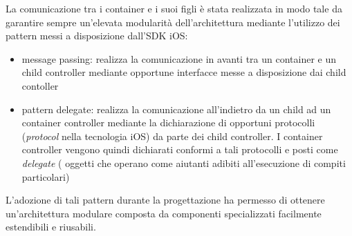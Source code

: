 La comunicazione tra i container e i suoi figli è stata realizzata in modo tale da garantire sempre un'elevata modularità dell'architettura mediante l'utilizzo dei pattern messi a disposizione dall'SDK iOS:

\begin{itemize}
 \item message passing: realizza la comunicazione in avanti tra un container e un child controller mediante opportune interfacce messe a disposizione dai child contoller
 \item pattern delegate: realizza la comunicazione all'indietro da un child ad un container controller mediante la dichiarazione di opportuni protocolli (\emph{protocol} nella tecnologia iOS) da parte dei child controller. I container controller vengono quindi dichiarati conformi a tali protocolli e posti come \emph{delegate} ( oggetti che operano come aiutanti adibiti all'esecuzione di compiti particolari)
\end{itemize}

L'adozione di tali pattern durante la progettazione ha permesso di ottenere un'architettura modulare composta da componenti specializzati facilmente estendibili e riusabili.

